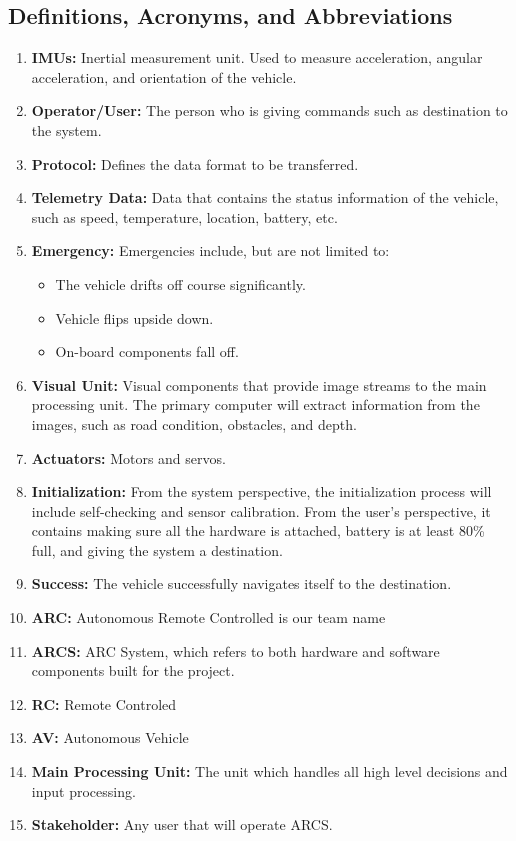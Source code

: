\documentclass[compsoc,draftclsnofoot,onecolumn,10pt]{IEEEtran}
\begin{document}
\subsection{Definitions, Acronyms, and Abbreviations} %
\begin{enumerate}
	\item \textbf{IMUs:} Inertial measurement unit. Used to measure acceleration, angular acceleration, and orientation of the vehicle.
	\item \textbf{Operator/User:} The person who is giving commands such as destination to the system.
	\item \textbf{Protocol:} Defines the data format to be transferred.
	\item \textbf{Telemetry Data:} Data that contains the status information of the vehicle, such as speed, temperature, location, battery, etc.
	\item \textbf{Emergency:} Emergencies include, but are not limited to: 
	\begin{itemize}
		\item The vehicle drifts off course significantly.
		\item Vehicle flips upside down.
		\item On-board components fall off.
	\end{itemize}
	\item \textbf{Visual Unit:} Visual components that provide image streams to the main processing unit. 
	The primary computer will extract information from the images, such as road condition, obstacles, and depth. 
	\item \textbf{Actuators:} Motors and servos.
	\item \textbf{Initialization:} From the system perspective, the initialization process will include self-checking and sensor calibration. 
	From the user's perspective, it contains making sure all the hardware is attached, battery is at least 80\% full, and giving the system a destination. 
	\item \textbf{Success:} The vehicle successfully navigates itself to the destination.
	\item \textbf{ARC:} Autonomous Remote Controlled is our team name
	\item \textbf{ARCS:} ARC System, which refers to both hardware and software components built for the project.
	\item \textbf{RC:} Remote Controled
	\item \textbf{AV:} Autonomous Vehicle
	\item \textbf{Main Processing Unit:} The unit which handles all high level decisions and input processing. 
	\item \textbf{Stakeholder:} Any user that will operate ARCS.
\end{enumerate}
\end{document}
